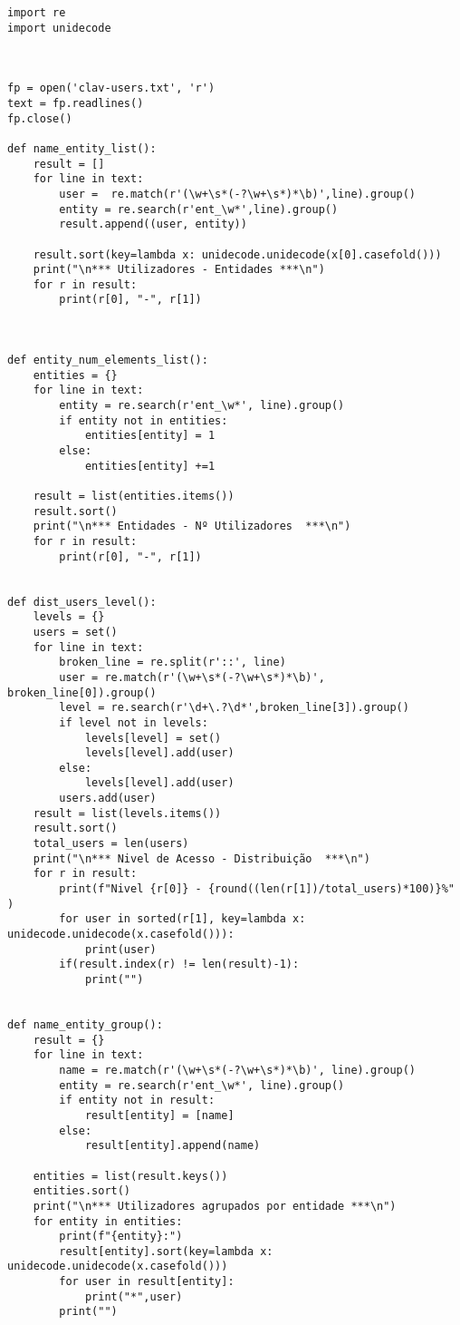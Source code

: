 \documentclass[11pt,a4paper]{report}%
\begin{document}
\begin{verbatim}
import re
import unidecode



fp = open('clav-users.txt', 'r')
text = fp.readlines()
fp.close()

def name_entity_list():
    result = []
    for line in text:
        user =  re.match(r'(\w+\s*(-?\w+\s*)*\b)',line).group()
        entity = re.search(r'ent_\w*',line).group()
        result.append((user, entity))

    result.sort(key=lambda x: unidecode.unidecode(x[0].casefold()))
    print("\n*** Utilizadores - Entidades ***\n")
    for r in result:
        print(r[0], "-", r[1])



def entity_num_elements_list():
    entities = {}
    for line in text:
        entity = re.search(r'ent_\w*', line).group()
        if entity not in entities:
            entities[entity] = 1
        else:
            entities[entity] +=1

    result = list(entities.items())
    result.sort()
    print("\n*** Entidades - Nº Utilizadores  ***\n")
    for r in result:
        print(r[0], "-", r[1])


def dist_users_level():
    levels = {}
    users = set()
    for line in text:
        broken_line = re.split(r'::', line)
        user = re.match(r'(\w+\s*(-?\w+\s*)*\b)', broken_line[0]).group()
        level = re.search(r'\d+\.?\d*',broken_line[3]).group()
        if level not in levels:
            levels[level] = set()
            levels[level].add(user)
        else:
            levels[level].add(user)
        users.add(user)
    result = list(levels.items())
    result.sort()
    total_users = len(users)
    print("\n*** Nivel de Acesso - Distribuição  ***\n")
    for r in result:
        print(f"Nivel {r[0]} - {round((len(r[1])/total_users)*100)}%" )
        for user in sorted(r[1], key=lambda x: unidecode.unidecode(x.casefold())):
            print(user)
        if(result.index(r) != len(result)-1):
            print("")


def name_entity_group():
    result = {}
    for line in text:
        name = re.match(r'(\w+\s*(-?\w+\s*)*\b)', line).group()
        entity = re.search(r'ent_\w*', line).group()
        if entity not in result:
            result[entity] = [name]
        else:
            result[entity].append(name)

    entities = list(result.keys())
    entities.sort()
    print("\n*** Utilizadores agrupados por entidade ***\n")
    for entity in entities:
        print(f"{entity}:")
        result[entity].sort(key=lambda x: unidecode.unidecode(x.casefold()))
        for user in result[entity]:
            print("*",user)
        print("")



\end{verbatim}
\end{document}
